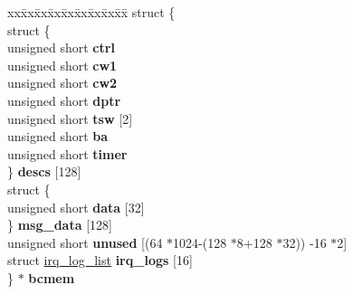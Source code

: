 \begin{DoxyCompactItemize}
\begin{tabbing}
xx\=xx\=xx\=xx\=xx\=xx\=xx\=xx\=xx\=\kill
struct \{\\
\>struct \{\\
\>\>unsigned short {\bfseries ctrl}\\
\>\>unsigned short {\bfseries cw1}\\
\>\>unsigned short {\bfseries cw2}\\
\>\>unsigned short {\bfseries dptr}\\
\>\>unsigned short {\bfseries tsw} \mbox{[}2\mbox{]}\\
\>\>unsigned short {\bfseries ba}\\
\>\>unsigned short {\bfseries timer}\\
\>\} {\bfseries descs} \mbox{[}128\mbox{]}\\
\>struct \{\\
\>\>unsigned short {\bfseries data} \mbox{[}32\mbox{]}\\
\>\} {\bfseries msg\_data} \mbox{[}128\mbox{]}\\
\>unsigned short {\bfseries unused} \mbox{[}(64 $\ast$1024-\/(128 $\ast$8+128 $\ast$32)) -\/16 $\ast$2\mbox{]}\\
\>struct \mbox{\hyperlink{structirq__log__list}{irq\_log\_list}} {\bfseries irq\_logs} \mbox{[}16\mbox{]}\\
\} $\ast$ {\bfseries bcmem}\\


\end{tabbing}
\end{DoxyCompactItemize}
